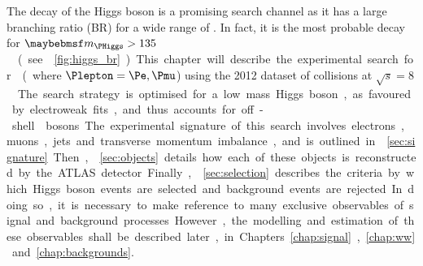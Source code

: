 
The \WW decay of the Higgs boson is a promising search channel as it has a large branching 
ratio (BR) for a wide range of \mH. In fact, it is the most probable decay for 
\unit{$\mH > 135$}{\GeV} (see \Figure~\ref{fig:higgs_br}). This chapter will describe the 
experimental search for \ggHWWlvlv (where $\Plepton = \Pe, \Pmu$) using the 2012 dataset 
of \pp collisions at \unit{$\sqrt{s} = 8$}{\TeV}. The search strategy is optimised for a 
low mass Higgs boson, as favoured by electroweak fits, and thus accounts for off-shell \PW 
bosons.

The experimental signature of this search involves electrons, muons, jets and transverse 
momentum imbalance, and is 
outlined in \Section~\ref{sec:signature}. Then, \Section~\ref{sec:objects} details how 
each of these objects is reconstructed by the ATLAS detector. Finally, 
\Section~\ref{sec:selection} describes the criteria by which Higgs boson events are 
selected and background events are rejected. In doing so, it is necessary to make 
reference to many exclusive observables of signal and background processes. However, 
the modelling and estimation of these observables shall be described later, in 
Chapters~\ref{chap:signal}, \ref{chap:ww} and \ref{chap:backgrounds}.

